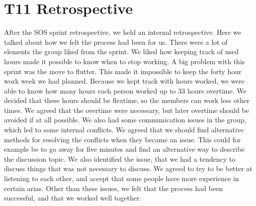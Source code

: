 \section{T11 Retrospective}
After the SOS sprint retrospective, we held an internal retrospective. 
Here we talked about how we felt the process had been for us. 
There were a lot of elements the group liked from the sprint. 
We liked how keeping track of used hours made it possible to know when to stop working. 
A big problem with this sprint was the move to flutter. This made it impossible to keep the forty hour work week we had planned. 
Because we kept track with hours worked, we were able to know how many hours each person worked up to 33 hours overtime. We decided that these hours should be flextime, so the members can work less other times. 
We agreed that the overtime were necessary, but later overtime should be avoided if at all possible.
We also had some communication issues in the group, which led to some internal conflicts. We agreed that we should find alternative methods for resolving the conflicts when they became an issue. This could for example be to go away for five minutes and find an alternative way to describe the discussion topic. 
We also identified the issue, that we had a tendency to discuss things that was not necessary to discuss. We agreed to try to be better at listening to each other, and accept that some people have more experience in certain arias. 
Other than these issues, we felt that the process had been successful, and that we worked well together.